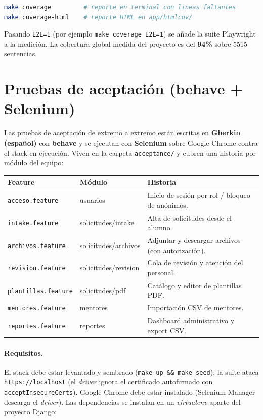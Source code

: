 \documentclass[12pt,letterpaper]{report}
\begin{document}
\begin{lstlisting}[language=bash]
make coverage         # reporte en terminal con lineas faltantes
make coverage-html    # reporte HTML en app/htmlcov/
\end{lstlisting}

Pasando \texttt{E2E=1} (por ejemplo \texttt{make coverage E2E=1}) se añade la suite
Playwright a la medición. La cobertura global medida del proyecto es del
\textbf{94\%} sobre 5515 sentencias.

\section{Pruebas de aceptación (behave + Selenium)}

Las pruebas de aceptación de extremo a extremo están escritas en \textbf{Gherkin
(español)} con \textbf{behave} y se ejecutan con \textbf{Selenium} sobre Google
Chrome contra el stack en ejecución. Viven en la carpeta \texttt{acceptance/} y
cubren una historia por módulo del equipo:

\begin{longtable}{L{4cm} L{4cm} L{6cm}}
\toprule
\textbf{Feature} & \textbf{Módulo} & \textbf{Historia} \\
\midrule
\endhead
\texttt{acceso.feature} & usuarios & Inicio de sesión por rol / bloqueo de anónimos. \\
\texttt{intake.feature} & solicitudes/intake & Alta de solicitudes desde el alumno. \\
\texttt{archivos.feature} & solicitudes/archivos & Adjuntar y descargar archivos (con autorización). \\
\texttt{revision.feature} & solicitudes/revision & Cola de revisión y atención del personal. \\
\texttt{plantillas.feature} & solicitudes/pdf & Catálogo y editor de plantillas PDF. \\
\texttt{mentores.feature} & mentores & Importación CSV de mentores. \\
\texttt{reportes.feature} & reportes & Dashboard administrativo y export CSV. \\
\bottomrule
\end{longtable}

\paragraph{Requisitos.} El stack debe estar levantado y sembrado
(\texttt{make up \&\& make seed}); la suite ataca \texttt{https://localhost} (el
\emph{driver} ignora el certificado autofirmado con \texttt{acceptInsecureCerts}).
Google Chrome debe estar instalado (Selenium Manager descarga el \emph{driver}).
Las dependencias se instalan en un \emph{virtualenv} aparte del proyecto Django:
\end{document}
